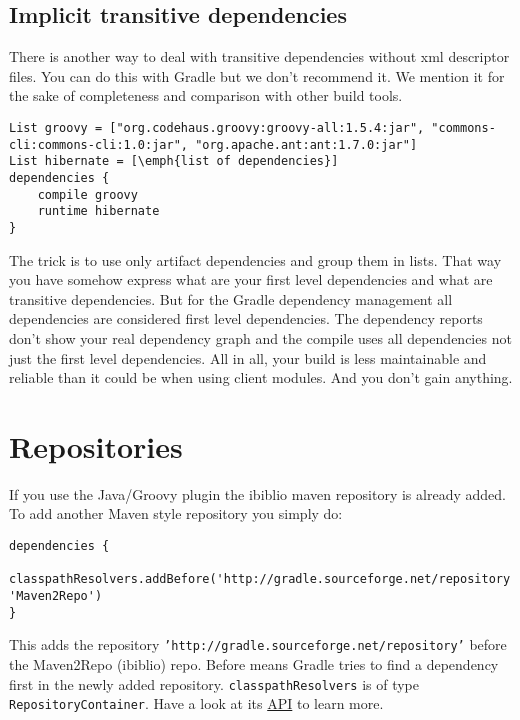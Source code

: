 \subsection{Implicit transitive dependencies} %
There is another way to deal with transitive dependencies without xml descriptor files. You can do this with Gradle but we don't recommend it. We mention it for the sake of completeness and comparison with other build tools. 

\begin{Verbatim}
List groovy = ["org.codehaus.groovy:groovy-all:1.5.4:jar", "commons-cli:commons-cli:1.0:jar", "org.apache.ant:ant:1.7.0:jar"]
List hibernate = [\emph{list of dependencies}]
dependencies {
	compile groovy
	runtime hibernate
}
\end{Verbatim}

The trick is to use only artifact dependencies and group them in lists. That way you have somehow express what are your first level dependencies and what are transitive dependencies. But for the Gradle dependency management all dependencies are considered first level dependencies. The dependency reports don't show your real dependency graph and the compile uses all dependencies not just the first level dependencies. All in all, your build is less maintainable and reliable than it could be when using client modules. And you don't gain anything.  

\label{sub:implicit_transitive_dependencies}



\section{Repositories} %
\label{sec:repositories}

If you use the Java/Groovy plugin the ibiblio maven repository is already added. To add another Maven style repository you simply do: 

\begin{Verbatim}
dependencies {
	classpathResolvers.addBefore('http://gradle.sourceforge.net/repository', 'Maven2Repo')
}
\end{Verbatim}

This adds the repository \texttt{'http://gradle.sourceforge.net/repository'} before the Maven2Repo (ibiblio) repo. Before means Gradle tries to find a dependency first in the newly added repository. \texttt{classpathResolvers} is of type \texttt{RepositoryContainer}. Have a look at its \href{}{API} to learn more.

